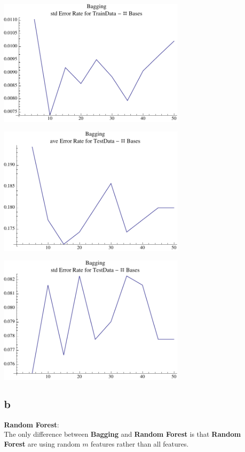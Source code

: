 \documentclass[12pt]{amsart}
\begin{document}
\begin{center}
\includegraphics[width=0.7\textwidth]{stdBGTrain.pdf}
\end{center}

\begin{center}
\includegraphics[width=0.7\textwidth]{aveBGTest.pdf}
\end{center}

\begin{center}
\includegraphics[width=0.7\textwidth]{stdBGTest.pdf}
\end{center}


\subsection*{b}
\textbf{Random Forest}:\\
The only difference between \textbf{Bagging} and \textbf{Random Forest} is that
\textbf{Random Forest} are using random $m$ features rather than all features.
\end{document}
